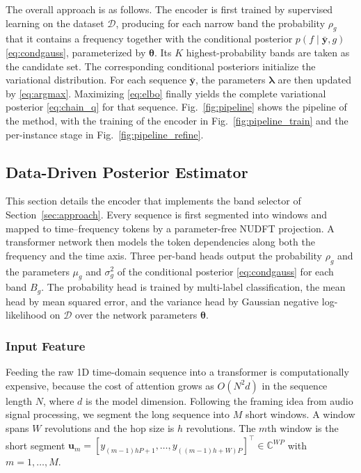 \documentclass[journal,onecolumn]{IEEEtran}
\begin{document}
The overall approach is as follows. The encoder is first trained by supervised learning on the dataset $\mathcal{D}$, producing for each narrow band the probability $\rho_g$ that it contains a frequency together with the conditional posterior $p(f\mid\bar{\mathbf{y}},g)$ \eqref{eq:condgauss}, parameterized by $\pmb{\theta}$. Its $K$ highest-probability bands are taken as the candidate set. The corresponding conditional posteriors initialize the variational distribution. For each sequence $\bar{\mathbf{y}}$, the parameters $\pmb{\lambda}$ are then updated by \eqref{eq:argmax}. Maximizing \eqref{eq:elbo} finally yields the complete variational posterior \eqref{eq:chain_q} for that sequence. Fig.~\ref{fig:pipeline} shows the pipeline of the method, with the training of the encoder in Fig.~\ref{fig:pipeline_train} and the per-instance stage in Fig.~\ref{fig:pipeline_refine}.

\subsection{Data-Driven Posterior Estimator}
\label{sec:estimator}

This section details the encoder that implements the band selector of Section~\ref{sec:approach}. Every sequence is first segmented into windows and mapped to time--frequency tokens by a parameter-free NUDFT projection. A transformer network then models the token dependencies along both the frequency and the time axis. Three per-band heads output the probability $\rho_g$ and the parameters $\mu_g$ and $\sigma_g^2$ of the conditional posterior \eqref{eq:condgauss} for each band $B_g$. The probability head is trained by multi-label classification, the mean head by mean squared error, and the variance head by Gaussian negative log-likelihood on $\mathcal{D}$ over the network parameters $\pmb{\theta}$.

\subsubsection{Input Feature}
\label{sec:input}

Feeding the raw 1D time-domain sequence into a transformer is computationally expensive, because the cost of attention grows as $O(N^2 d)$ in the sequence length $N$, where $d$ is the model dimension. Following the framing idea from audio signal processing, we segment the long sequence into $M$ short windows. A window spans $W$ revolutions and the hop size is $h$ revolutions. The $m$th window is the short segment $\mathbf{u}_m=[y_{(m-1)hP+1},\dots,y_{((m-1)h+W)P}]^{\top}\in\mathbb{C}^{WP}$ with $m=1,\dots,M$.
\end{document}

